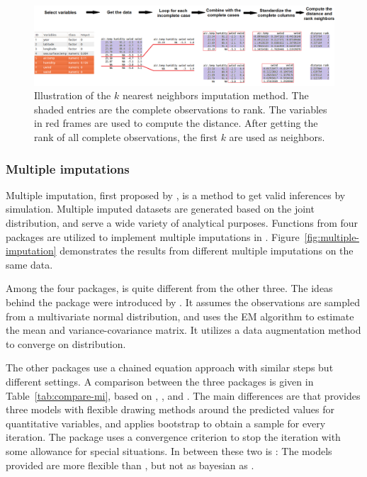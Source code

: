 \documentclass[article]{jss}
\begin{document}
\begin{center}
\begin{figure}[h]
\begin{centering}
\includegraphics[width=1\textwidth]{graph/fig9-diagram}
\par\end{centering}
\caption{Illustration of the $k$ nearest neighbors imputation method.
The shaded entries are the complete observations to rank. The
variables in red frames are used to compute the distance. After
getting the rank of all complete observations, the first $k$ are
used as neighbors.}
\label{fig:neighbor-diagram}
\end{figure}
\par\end{center}


\subsubsection{Multiple imputations}

Multiple imputation, first proposed by \citet{rubin1978multiple},
is a method to get valid inferences by simulation. Multiple
imputed datasets are generated based on the joint distribution,
and serve a wide variety of analytical purposes. Functions from
four  packages are utilized to implement multiple
imputations in . Figure~\ref{fig:multiple-imputation}
demonstrates the results from different multiple imputations
on the same data. 

Among the four packages,  is quite different from
the other three. The ideas behind the package were introduced
by \citet{schafer1998multiple}. It assumes the observations
are sampled from a multivariate normal distribution, and uses
the EM algorithm to estimate the mean and variance-covariance
matrix. It utilizes a data augmentation method to converge on
distribution. 

The other packages use a chained equation approach with similar
steps but different settings. A comparison between the three
packages is given in Table~\ref{tab:compare-mi}, based on
\citet{hmisc}, \citet{mice}, and \citet{mi}. The main differences
are that  provides three models with flexible drawing
methods around the predicted values for quantitative variables,
and applies bootstrap to obtain a sample for every iteration.
The package  uses a convergence criterion to stop the
iteration with some allowance for special situations. In between
these two is : The models provided are more flexible
than , but not as bayesian as .
\end{document}
